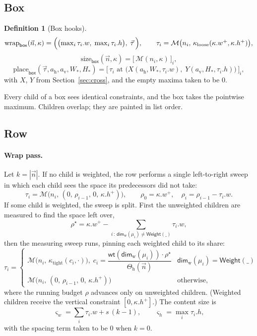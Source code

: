 \documentclass[11pt,a4paper]{article}
\newcommand{\Weight}{\mathsf{Weight}}
\newcommand{\bbox}{\mathsf{box}}
\newcommand{\Mm}{\mathcal{M}}          %
\newcommand{\Dimw}{\mathsf{dim}_{\mathrm{w}}}
\newcommand{\wt}{\mathsf{wt}}
\theoremstyle{definition}
\newtheorem{definition}{Definition}[section]
\theoremstyle{plain}
\theoremstyle{remark}
\begin{document}
\subsection{Box}

\begin{definition}[Box hooks]
\[
  \mathrm{wrap}_{\bbox}(\vec{n}, \kappa) =
    \Bigl(\bigl(\textstyle\max_i \tau_i.w,\; \max_i \tau_i.h\bigr),\; \vec{\tau}\,\Bigr),
  \qquad \tau_i = \Mm\bigl(n_i,\, \kappa_{\mathrm{loose}}(\kappa.w^+, \kappa.h^+)\bigr),
\]
\[
  \mathrm{size}_{\bbox}(\vec{n}, \kappa) = \bigl[\,\Mm(n_i, \kappa)\,\bigr]_i ,
\]
\[
  \mathrm{place}_{\bbox}(\vec{\tau}, a_{\mathrm{h}}, a_{\mathrm{v}}, W_{\!*}, H_{\!*})
    = \bigl[\,\tau_i \text{ at } \bigl(X(a_{\mathrm{h}}, W_{\!*}, \tau_i.w),\;
                                       Y(a_{\mathrm{v}}, H_{\!*}, \tau_i.h)\bigr)\,\bigr]_i ,
\]
with $X$, $Y$ from Section~\ref{sec:cross}, and the empty maxima taken to be $0$.
\end{definition}

Every child of a box sees identical constraints, and the box takes the pointwise
maximum. Children overlap; they are painted in list order.

\subsection{Row}
\label{sec:row}

\paragraph{Wrap pass.}
Let $k = |\vec{n}|$. If no child is weighted, the row performs a single
left-to-right sweep in which each child sees the space its predecessors did not
take:
\[
  \tau_i = \Mm\bigl(n_i,\, (0,\, \rho_{i-1},\, 0,\, \kappa.h^+)\bigr),
  \qquad \rho_0 = \kappa.w^+, \quad \rho_i = \rho_{i-1} - \tau_i.w .
\]
If some child is weighted, the sweep is split. First the unweighted children are
measured to find the space left over,
\[
  \rho^\star = \kappa.w^+ - \!\!\sum_{i \,:\, \Dimw(\mu_i) \neq \Weight(\_)}\!\! \tau_i.w ,
\]
then the measuring sweep runs, pinning each weighted child to its share:
\[
  \tau_i = \begin{cases}
    \Mm\bigl(n_i,\, \kappa_{\mathrm{tight}}(c_i, \cdot)\bigr),\;
      c_i = \dfrac{\wt(\Dimw(\mu_i)) \cdot \rho^\star}{\Theta_{\mathrm{h}}(\vec{n})}
      & \Dimw(\mu_i) = \Weight(\_) \\[10pt]
    \Mm\bigl(n_i,\, (0,\, \rho_{i-1},\, 0,\, \kappa.h^+)\bigr) & \text{otherwise,}
  \end{cases}
\]
where the running budget $\rho$ advances only on unweighted children. (Weighted
children receive the vertical constraint $[0, \kappa.h^+]$.) The content size is
\[
  \varsigma_w = \sum_i \tau_i.w + s\,(k-1), \qquad
  \varsigma_h = \max_i \tau_i.h ,
\]
with the spacing term taken to be $0$ when $k = 0$.
\end{document}
